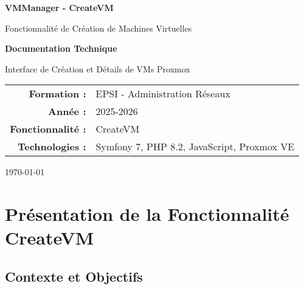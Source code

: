 \documentclass[12pt,a4paper]{report}
\begin{document}
\begin{titlepage}
    \centering
    \vspace*{2cm}
    
    {\Huge\bfseries VMManager - CreateVM\par}
    \vspace{0.5cm}
    {\Large Fonctionnalité de Création de Machines Virtuelles\par}
    
    \vspace{2cm}
    
    {\LARGE\bfseries Documentation Technique\par}
    {\Large Interface de Création et Détails de VMs Proxmox\par}
    
    \vspace{3cm}
    
    \begin{tabular}{rl}
        \textbf{Formation :} & EPSI - Administration Réseaux \\
        \textbf{Année :} & 2025-2026 \\
        \textbf{Fonctionnalité :} & CreateVM \\
        \textbf{Technologies :} & Symfony 7, PHP 8.2, JavaScript, Proxmox VE \\
    \end{tabular}
    
    \vfill
    
    {\large \today\par}
\end{titlepage}

\tableofcontents
\newpage

\chapter{Présentation de la Fonctionnalité CreateVM}

\section{Contexte et Objectifs}
\end{document}
